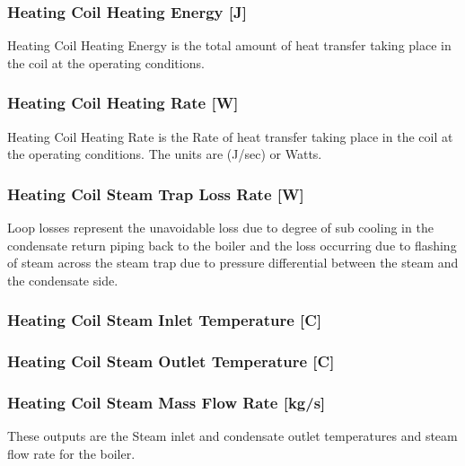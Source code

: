 \subsubsection{Heating Coil Heating Energy {[}J{]}}\label{heating-coil-heating-energy-j-1}

Heating Coil Heating Energy is the total amount of heat transfer taking place in the coil at the operating conditions.

\subsubsection{Heating Coil Heating Rate {[}W{]}}\label{heating-coil-heating-rate-w-1}

Heating Coil Heating Rate is the Rate of heat transfer taking place in the coil at the operating conditions. The units are (J/sec) or Watts.

\subsubsection{Heating Coil Steam Trap Loss Rate {[}W{]}}\label{heating-coil-steam-trap-loss-rate-w}

Loop losses represent the unavoidable loss due to degree of sub cooling in the condensate return piping back to the boiler and the loss occurring due to flashing of steam across the steam trap due to pressure differential between the steam and the condensate side.

\subsubsection{Heating Coil Steam Inlet Temperature {[}C{]}}\label{heating-coil-steam-inlet-temperature-c}

\subsubsection{Heating Coil Steam Outlet Temperature {[}C{]}}\label{heating-coil-steam-outlet-temperature-c}

\subsubsection{Heating Coil Steam Mass Flow Rate {[}kg/s{]}}\label{heating-coil-steam-mass-flow-rate-kgs}

These outputs are the Steam inlet and condensate outlet temperatures and steam flow rate for the boiler.

